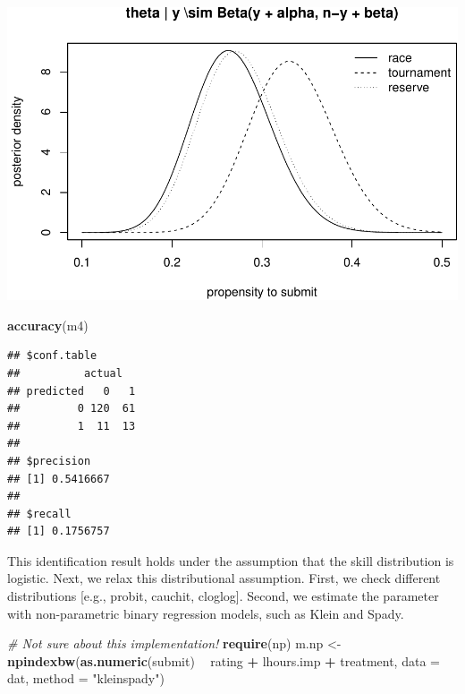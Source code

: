 \documentclass[]{article}
\newenvironment{Shaded}{\begin{snugshade}}{\end{snugshade}}
\newcommand{\KeywordTok}[1]{\textcolor[rgb]{0.13,0.29,0.53}{\textbf{#1}}}
\newcommand{\DataTypeTok}[1]{\textcolor[rgb]{0.13,0.29,0.53}{#1}}
\newcommand{\StringTok}[1]{\textcolor[rgb]{0.31,0.60,0.02}{#1}}
\newcommand{\CommentTok}[1]{\textcolor[rgb]{0.56,0.35,0.01}{\textit{#1}}}
\newcommand{\OperatorTok}[1]{\textcolor[rgb]{0.81,0.36,0.00}{\textbf{#1}}}
\newcommand{\NormalTok}[1]{#1}
\let\oldShaded\Shaded
\let\endoldShaded\endShaded
\renewenvironment{Shaded}{\footnotesize\oldShaded}{\endoldShaded}
\begin{document}
\includegraphics{Figures/unnamed-chunk-6-1.pdf}

\begin{Shaded}
\begin{Highlighting}[]
\KeywordTok{accuracy}\NormalTok{(m4)}
\end{Highlighting}
\end{Shaded}

\begin{verbatim}
## $conf.table
##          actual
## predicted   0   1
##         0 120  61
##         1  11  13
## 
## $precision
## [1] 0.5416667
## 
## $recall
## [1] 0.1756757
\end{verbatim}

This identification result holds under the assumption that the skill
distribution is logistic. Next, we relax this distributional assumption.
First, we check different distributions {[}e.g., probit, cauchit,
cloglog{]}. Second, we estimate the parameter with non-parametric binary
regression models, such as Klein and Spady.

\begin{Shaded}
\begin{Highlighting}[]
\CommentTok{# Not sure about this implementation!}
\KeywordTok{require}\NormalTok{(np)}
\NormalTok{m.np <-}\StringTok{ }\KeywordTok{npindexbw}\NormalTok{(}\KeywordTok{as.numeric}\NormalTok{(submit) }\OperatorTok{~}\StringTok{ }\NormalTok{rating }\OperatorTok{+}\StringTok{ }\NormalTok{lhours.imp }\OperatorTok{+}\StringTok{ }
\StringTok{    }\NormalTok{treatment, }\DataTypeTok{data =}\NormalTok{ dat, }\DataTypeTok{method =} \StringTok{"kleinspady"}\NormalTok{)}
\end{Highlighting}
\end{Shaded}
\end{document}
